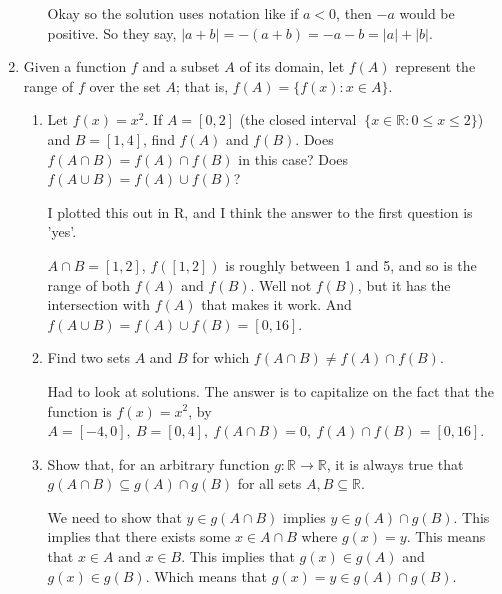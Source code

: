 \documentclass{article}
\numberwithin{equation}{subsection}
\numberwithin{theo}{subsection}
\begin{document}
\begin{enumerate}
\begin{enumerate}
                Okay so the solution uses notation like if $a < 0$, then $-a$
                would be positive. So they say, $\lvert a + b \rvert = -(a + b)
                = -a-b = \lvert a \rvert + \lvert b \rvert$.

        \end{enumerate}

    \item Given a function $f$ and a subset $A$ of its domain, let $f(A)$ represent the
        range of $f$ over the set $A$; that is, $f(A) = \{f(x) : x \in A\}$.

        \begin{enumerate}
            \item Let $f(x) = x^2$. If $A = [0, 2]$ (the closed interval $~\{x
                \in \mathbb{R} : 0 \leq x \leq 2 \}$) and $B = [1, 4]$, find
                $f(A)$ and $f(B)$. Does $f(A \cap B) = f(A) \cap f(B)$ in this
                case? Does $f(A \cup B) = f(A) \cup f(B)$? 

            I plotted this out in R, and I think the answer to the first
            question is 'yes'. 

            $A \cap B = [1,2]$, $f([1,2])$ is roughly between 1 and 5, and so
           is the range of both $f(A)$ and $f(B)$. Well not $f(B)$, but it has
           the intersection with $f(A)$ that makes it work. And $f(A \cup B) =
           f(A) \cup f(B) = [0, 16]$.

       \item Find two sets $A$ and $B$ for which $f(A \cap B) \neq f(A) \cap
           f(B)$.

           Had to look at solutions. The answer is to capitalize on the fact
           that the function is $f(x) = x^2$, by $A = [-4, 0],~B = [0,
           4],~f(A\cap B) = {0},~f(A) \cap f(B) = [0, 16]$.

        \item Show that, for an arbitrary function $g: \mathbb{R} \rightarrow \mathbb{R}$,
            it is always true that $g(A \cap B) \subseteq g(A) \cap g(B)$ for all sets $A,
            B \subseteq \mathbb{R}$.

            We need to show that $y \in g(A \cap B)$ implies $y
            \in g(A) \cap g(B)$. This implies that there exists some $x \in A \cap B$
            where $g(x) = y$. This means that $x \in A$ and $x \in B$. This implies that
            $g(x) \in g(A)$ and $g(x) \in g(B)$. Which means that $g(x) = y \in g(A) \cap
            g(B)$.


\end{enumerate}
\end{enumerate}
\end{document}
